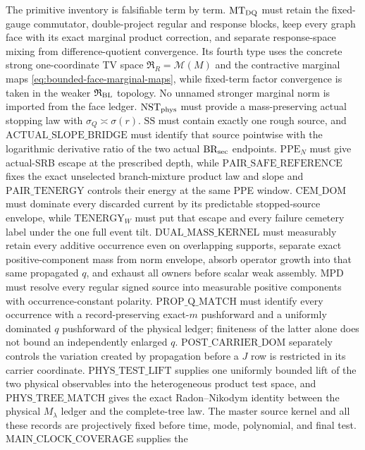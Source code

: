 \documentclass[11pt]{article}
\begin{document}
The primitive inventory is falsifiable term by term.  $\mathrm{MT}_{\rm DQ}$ must
retain the fixed-gauge commutator, double-project regular and response blocks,
keep every graph face with its exact marginal product correction, and
separate response-space mixing from difference-quotient convergence.  Its
fourth type uses the concrete strong one-coordinate TV space
$\mathfrak R_R=\mathcal M(M)$ and the contractive marginal maps
\eqref{eq:bounded-face-marginal-maps}, while fixed-term factor convergence
is taken in the weaker $\mathfrak R_{\rm BL}$ topology.  No unnamed stronger
marginal norm is imported from the face ledger.
$\mathrm{NST}_{\rm phys}$ must provide a
mass-preserving actual stopping law with
$\sigma_Q\asymp\sigma(r)$.  $\mathrm{SS}$ must contain exactly one rough source, and
$\mathrm{ACTUAL\_SLOPE\_BRIDGE}$ must identify that source pointwise with
the logarithmic derivative ratio of the two actual $\mathrm{BR}_{\rm sec}$
endpoints.  $\mathrm{PPE}_{N}$ must give actual-SRB escape at the prescribed
depth, while $\mathrm{PAIR\_SAFE\_REFERENCE}$ fixes the exact unselected
branch-mixture product law and slope and $\mathrm{PAIR\_TENERGY}$ controls
their energy at the same PPE window.
$\mathrm{CEM\_DOM}$ must dominate every discarded current by its predictable
stopped-source envelope, while $\mathrm{TENERGY}_{W}$ must put that escape
and every failure cemetery label under the one full event tilt.
$\mathrm{DUAL\_MASS\_KERNEL}$ must measurably retain every additive
occurrence even on overlapping supports, separate exact positive-component
mass from norm
envelope, absorb operator growth into that same propagated $q$, and exhaust
all owners before scalar weak assembly.  $\mathrm{MPD}$ must resolve every
regular signed source into measurable positive components with
occurrence-constant polarity.  $\mathrm{PROP\_Q\_MATCH}$ must identify every
occurrence with a record-preserving exact-$m$ pushforward and a uniformly
dominated $q$ pushforward of the physical ledger; finiteness of the latter
alone does not bound an independently enlarged $q$.
$\mathrm{POST\_CARRIER\_DOM}$ separately controls the variation created by
propagation before a $J$ row is restricted in its carrier coordinate.
$\mathrm{PHYS\_TEST\_LIFT}$ supplies one uniformly bounded lift of the two
physical observables into the heterogeneous product test space, and
$\mathrm{PHYS\_TREE\_MATCH}$ gives the exact Radon--Nikodym identity between
the physical $M_\lambda$ ledger and the complete-tree law.  The master
source kernel and all these records are projectively fixed before time,
mode, polynomial, and final test.  $\mathrm{MAIN\_CLOCK\_COVERAGE}$ supplies the
\end{document}

